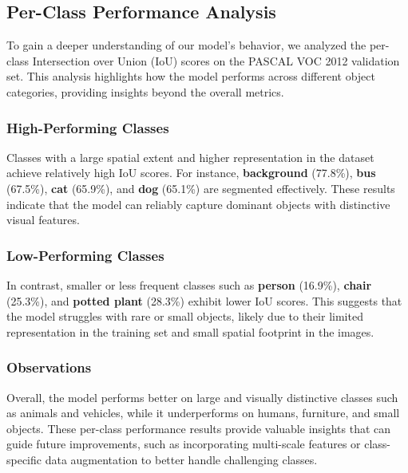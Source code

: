 
\subsection{Per-Class Performance Analysis}
\label{subsec:per_class_performance_analysis}

To gain a deeper understanding of our model’s behavior, we analyzed the per-class Intersection over Union (IoU) scores on the PASCAL VOC 2012 validation set. This analysis highlights how the model performs across different object categories, providing insights beyond the overall metrics.

\subsubsection{High-Performing Classes}

Classes with a large spatial extent and higher representation in the dataset achieve relatively high IoU scores. For instance, \textbf{background} (77.8\%), \textbf{bus} (67.5\%), \textbf{cat} (65.9\%), and \textbf{dog} (65.1\%) are segmented effectively. These results indicate that the model can reliably capture dominant objects with distinctive visual features.

\subsubsection{Low-Performing Classes}

In contrast, smaller or less frequent classes such as \textbf{person} (16.9\%), \textbf{chair} (25.3\%), and \textbf{potted plant} (28.3\%) exhibit lower IoU scores. This suggests that the model struggles with rare or small objects, likely due to their limited representation in the training set and small spatial footprint in the images.

\subsubsection{Observations}

Overall, the model performs better on large and visually distinctive classes such as animals and vehicles, while it underperforms on humans, furniture, and small objects. These per-class performance results provide valuable insights that can guide future improvements, such as incorporating multi-scale features or class-specific data augmentation to better handle challenging classes.



